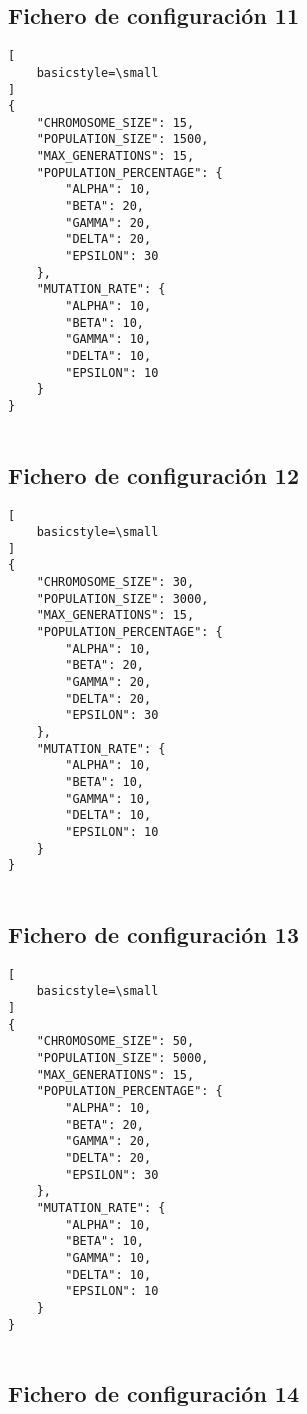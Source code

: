 \subsection{Fichero de configuración 11} \label{subsect:config_file_11}

\begin{lstlisting}[
    basicstyle=\small
]
{
    "CHROMOSOME_SIZE": 15,
    "POPULATION_SIZE": 1500,
    "MAX_GENERATIONS": 15,
    "POPULATION_PERCENTAGE": {
        "ALPHA": 10,
        "BETA": 20,
        "GAMMA": 20,
        "DELTA": 20,
        "EPSILON": 30
    },
    "MUTATION_RATE": {
        "ALPHA": 10,
        "BETA": 10,
        "GAMMA": 10,
        "DELTA": 10,
        "EPSILON": 10
    }
}
   
\end{lstlisting}

\subsection{Fichero de configuración 12} \label{subsect:config_file_12}

\begin{lstlisting}[
    basicstyle=\small
]
{
    "CHROMOSOME_SIZE": 30,
    "POPULATION_SIZE": 3000,
    "MAX_GENERATIONS": 15,
    "POPULATION_PERCENTAGE": {
        "ALPHA": 10,
        "BETA": 20,
        "GAMMA": 20,
        "DELTA": 20,
        "EPSILON": 30
    },
    "MUTATION_RATE": {
        "ALPHA": 10,
        "BETA": 10,
        "GAMMA": 10,
        "DELTA": 10,
        "EPSILON": 10
    }
}
   
\end{lstlisting}

\subsection{Fichero de configuración 13} \label{subsect:config_file_13}

\begin{lstlisting}[
    basicstyle=\small
]
{
    "CHROMOSOME_SIZE": 50,
    "POPULATION_SIZE": 5000,
    "MAX_GENERATIONS": 15,
    "POPULATION_PERCENTAGE": {
        "ALPHA": 10,
        "BETA": 20,
        "GAMMA": 20,
        "DELTA": 20,
        "EPSILON": 30
    },
    "MUTATION_RATE": {
        "ALPHA": 10,
        "BETA": 10,
        "GAMMA": 10,
        "DELTA": 10,
        "EPSILON": 10
    }
}
   
\end{lstlisting}

\subsection{Fichero de configuración 14} \label{subsect:config_file_14}


